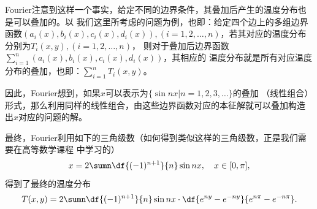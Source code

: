 \begin{shaded}
	Fourier注意到这样一个事实，给定不同的边界条件，其叠加后产生的温度分布也是可以叠加的。以
	我们这里所考虑的问题为例，也即：给定四个边上的多组边界函数$(a_i(x),b_i(x),c_i(x),
	d_i(x)),(i=1,2,\ldots,n)$，若其对应的温度分布分别为$T_i(x,y),(i=1,2,\ldots,n)$，
	则对于叠加后边界函数$\sum\limits_{i=1}^n(a_i(x),b_i(x),c_i(x),d_i(x))$，其相应的
	温度分布就是所有对应温度分布的叠加，也即：$\sum\limits_{i=1}^nT_i(x,y)$。
	
	因此，Fourier想到，如果$x$可以表示为$\{\sin nx|n=1,2,3,\ldots\}$的叠加
	（线性组合）形式，那么利用同样的线性组合，由这些边界函数对应的本征解就可以叠加构造
	出$x$对应的问题的解。
	
	最终，Fourier利用如下的三角级数（如何得到类似这样的三角级数，正是我们需要在高等数学课程
	中学习的）
	$$x=2\sumn\df{(-1)^{n+1}}{n}\sin{nx},\quad x\in[0,\pi],$$
	得到了最终的温度分布
	$$T(x,y)=2\sumn\df{(-1)^{n+1}}{n}\sin{nx}
	\cdot\df{e^{ny}-e^{-ny}}{e^{n\pi}-e^{-n\pi}}.$$
	

\end{shaded}

